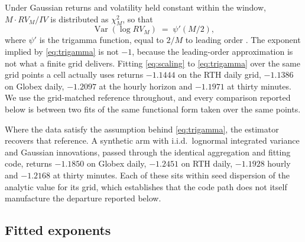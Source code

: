Under Gaussian returns and volatility held constant within the window,
$M \cdot RV_M / IV$ is distributed as $\chi^2_M$, so that
\begin{equation}\label{eq:trigamma}
\operatorname{Var}\!\left(\log RV_M\right) \;=\; \psi'\!\left(M/2\right),
\end{equation}
where $\psi'$ is the trigamma function, equal to $2/M$ to leading
order \citep{bns2002}. The exponent implied by \eqref{eq:trigamma} is not $-1$,
because the leading-order approximation is not what a finite grid delivers.
Fitting \eqref{eq:scaling} to \eqref{eq:trigamma} over the same grid points a
cell actually uses returns $-1.1444$ on the RTH daily grid, $-1.1386$ on Globex %
daily, $-1.2097$ at the hourly horizon and $-1.1971$ at thirty minutes. We use %
the grid-matched reference throughout, and every comparison reported below is
between two fits of the same functional form taken over the same points.

Where the data satisfy the assumption behind \eqref{eq:trigamma}, the estimator
recovers that reference. A synthetic arm with i.i.d.\ lognormal integrated
variance and Gaussian innovations, passed through the identical aggregation and
fitting code, returns $-1.1850$ on Globex daily, $-1.2451$ on RTH daily, %
$-1.1928$ hourly and $-1.2168$ at thirty minutes. Each of these sits within seed %
dispersion of the analytic value for its grid, which establishes that the code
path does not itself manufacture the departure reported below.

\subsection{Fitted exponents}

